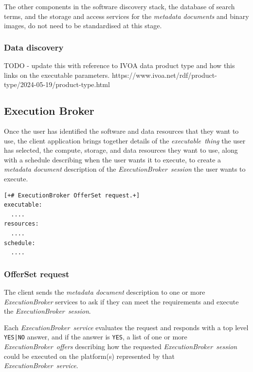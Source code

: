 \documentclass[11pt,a4paper]{ivoa}
\newcommand{\ivoa} {IVOA}
\newcommand{\execbrokerclass} {\textit{ExecutionBroker}}
\newcommand{\execbrokerservice}[1] {\textit{ExecutionBroker~service#1}}
\newcommand{\execoffer}[1] {\textit{ExecutionBroker~offer#1}}
\newcommand{\execsession}[1] {\textit{ExecutionBroker~session#1}}
\newcommand{\executablething}[1] {\textit{executable~thing#1}}
\newcommand{\metadoc} [1]{\textit{metadata document#1}}
\newcommand{\codeword}[1] {\texttt{#1}}
\begin{document}
The other components in the software discovery stack, the database of search terms, and
the storage and access services for the \metadoc{s} and binary images, do not need to be
standardised at this stage.

\subsubsection{Data discovery}
\label{subsub-data-discovery}

TODO - update this with reference to \ivoa{} data product type and how this links on the
executable parameters.
https://www.ivoa.net/rdf/product-type/2024-05-19/product-type.html

\subsection{Execution Broker}
\label{sub-execution-broker}

Once the user has identified the software and data resources that they want to use,
the client application brings together details of the \executablething{} the user
has selected, the compute, storage, and data resources they want to use,
along with a schedule describing when the user wants it to execute,
to create a \metadoc{} description of the \execsession{} the user wants
to execute.

\begin{lstlisting}[]
[+# ExecutionBroker OfferSet request.+]
executable:
  ....
resources:
  ....
schedule:
  ....
\end{lstlisting}

\subsubsection{OfferSet request}
\label{subsub-offerset-request}

The client sends the \metadoc{} description to one or more \execbrokerclass{}
services to ask if they can meet the requirements and execute the \execsession{}.

Each \execbrokerservice{} evaluates the request and responds with a top level
\codeword{YES|NO} answer, and if
the answer is \codeword{YES}, a list of one or more \execoffer{s} describing how
the requested \execsession{} could be executed on the platform(s) represented by
that \execbrokerservice{}.

\end{document}
